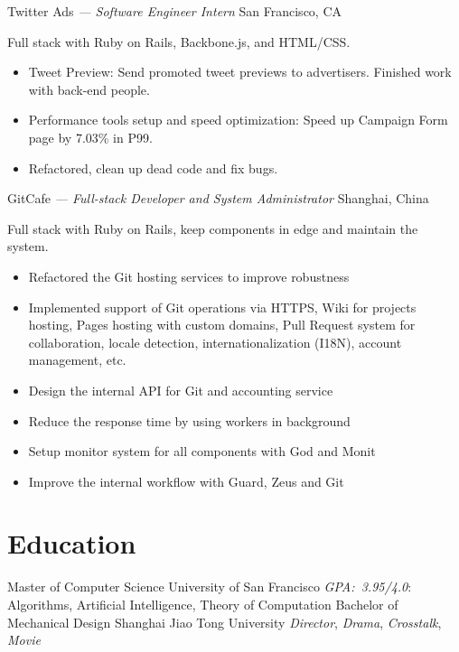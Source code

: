 \documentclass[]{friggeri-cv} %
\begin{document}
\begin{entrylist}
{\begin{itemize}
    \end{itemize}
  }
  {Twitter Ads \emph{--- Software Engineer Intern}}
  {San Francisco, CA}
  {
    Full stack with Ruby on Rails, Backbone.js, and HTML/CSS.\@
    \begin{itemize}
      \item Tweet Preview: Send promoted tweet previews to advertisers. Finished work with back-end people.
      \item Performance tools setup and speed optimization: Speed up Campaign Form page by 7.03\% in P99.
      \item Refactored, clean up dead code and fix bugs.
    \end{itemize}
  }
  {GitCafe \emph{--- Full-stack Developer and System Administrator}}
  {Shanghai, China}
  {
    Full stack with Ruby on Rails, keep components in edge and maintain the system.\@
    \begin{itemize}
    \item Refactored the Git hosting services to improve robustness
    \item Implemented support of Git operations via HTTPS, Wiki for projects hosting,
    Pages hosting with custom domains, Pull Request system for collaboration,
    locale detection, internationalization (I18N), account management, etc.
    \item Design the internal API for Git and accounting service
    \item Reduce the response time by using workers in background
    \item Setup monitor system for all components with God and Monit
    \item Improve the internal workflow with Guard, Zeus and Git
    \end{itemize}
  }
\end{entrylist}


\section{Education}

\begin{entrylist}
  {Master \textnormal{of Computer Science}}
  {University of San Francisco}
  {
    \emph{GPA:~3.95/4.0}: Algorithms, Artificial Intelligence, Theory of Computation
  }
  {Bachelor \textnormal{of Mechanical Design}}
  {Shanghai Jiao Tong University}
  {
    \emph{Director}, \emph{Drama}, \emph{Crosstalk}, \emph{Movie}
  }
\end{entrylist}
\end{document}
